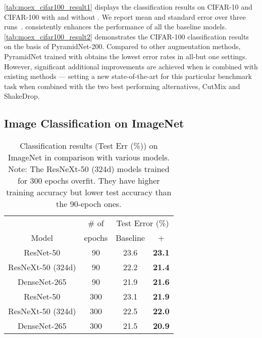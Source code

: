 \documentclass[final]{cvpr}
\begin{document}
\autoref{tab:moex_cifar100_result1} displays the classification results on CIFAR-10 and CIFAR-100 with and without \methodname{}. We report mean and standard error over three runs~\cite{gurland1971simple}. \methodname{} consistently enhances the performance of all the baseline models. 
\autoref{tab:moex_cifar100_result2} demonstrates the CIFAR-100 classification results on the basis of PyramidNet-200. 
Compared to other augmentation methods, PyramidNet trained with \methodname{} obtains the lowest error rates in all-but one settings. However, significant additional improvements are achieved when \methodname{}  is combined with existing methods  --- setting a new  state-of-the-art for this particular benchmark task when combined with the two best performing alternatives, CutMix and ShakeDrop.






\subsection{Image Classification on ImageNet}

\begin{table}[t]
    \centering
    \begin{tabular}{c|c|c|c}
\toprule
& \multicolumn{1}{c}{\# of} & \multicolumn{2}{|c}{Test  Error (\%)} \\
\cline{3-4}
Model & epochs & Baseline &+\methodname{}  \\  
\midrule\midrule
ResNet-50   & 90 &23.6 &\textbf{23.1}  \\
ResNeXt-50 (324d)& 90 & 22.2 &\textbf{21.4}   \\
DenseNet-265 &90&21.9 & \textbf{21.6}    \\
\midrule
ResNet-50 &  300& 23.1&\textbf{21.9} \\
ResNeXt-50 (324d) &300 & 22.5 &\textbf{22.0}  \\
DenseNet-265 &300& 21.5&\textbf{20.9}  \\
\bottomrule
\end{tabular}
\caption{Classification results (Test Err (\%)) on ImageNet in comparison with various models.
Note: The ResNeXt-50 (324d) models trained for 300 epochs overfit. They have higher training accuracy but lower test accuracy than the 90-epoch ones.}
\label{tab:moex_imagenet_baseline_result} \end{table}
\end{document}
